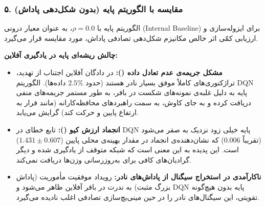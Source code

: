 \documentclass[oneside,openany,a4paper,12pt]{article}
\begin{document}
\subsubsection{۵. مقایسه با الگوریتم پایه  (بدون شکل‌دهی پاداش)}

الگوریتم  پایه با $\rho=0.0$، به عنوان معیار درونی (Internal Baseline) برای ایزوله‌سازی و ارزیابی کمّی اثر خالص مکانیزم شکل‌دهی تصادفی پاداش، مورد مقایسه قرار می‌گیرد.

\textbf{چالش ریشه‌ای  پایه در یادگیری آفلاین:}
\begin{itemize}
    \item \textbf{مشکل جریمه‌ی عدم تعادل داده ():} در دادگان آفلاین اجتناب از تهدید، تراژکتوری‌های کاملاً موفق بسیار نادر هستند (حدود $2.5\%$ داده‌ها). الگوریتم DQN پایه به دلیل غلبه‌ی نمونه‌های شکست در بافر، به طور مستمر جریمه‌های منفی دریافت کرده و به جای کاوش، به سمت راهبردهای محافظه‌کارانه (مانند فرار به ارتفاع پایین و حرکت کند) گرایش می‌یابد.
    \item \textbf{انجماد ارزش کیو ():} تابع خطای  در DQN پایه خیلی زود نزدیک به صفر می‌شود (تقریباً $0.006$) که نشان‌دهنده‌ی انجماد  در مقدار بهینه‌ی محلی پایین ($1.431 \pm 0.607$) است. این پدیده به این معنی است که شبکه متوقف از یادگیری شده و دیگر گرادیان‌های کافی برای به‌روزرسانی وزن‌ها دریافت نمی‌کند.
    \item \textbf{ناکارآمدی در استخراج سیگنال از پاداش‌های نادر:} رویداد موفقیت مأموریت (پاداش بزرگ مثبت) به ندرت در بافر آفلاین ظاهر می‌شود و DQN پایه بدون هیچ‌گونه تقویتی، این سیگنال‌های نادر را در حین مینی‌بچ‌سازی تصادفی اغلب نادیده می‌گیرد.
\end{itemize}
\end{document}
